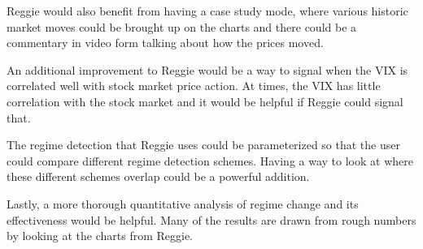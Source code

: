 \documentclass[conference]{IEEEtran}
\begin{document}
Reggie would also benefit from having a case study mode, where various historic market moves could be brought up on the charts and there could be a commentary in video form talking about how the prices moved. 

An additional improvement to Reggie would be a way to signal when the VIX is correlated well with stock market price action. At times, the VIX has little correlation with the stock market and it would be helpful if Reggie could signal that.

The regime detection that Reggie uses could be parameterized so that the user could compare different regime detection schemes. Having a way to look at where these different schemes overlap could be a powerful addition.

Lastly, a more thorough quantitative analysis of regime change and its effectiveness would be helpful. Many of the results are drawn from rough numbers by looking at the charts from Reggie.
\end{document}
